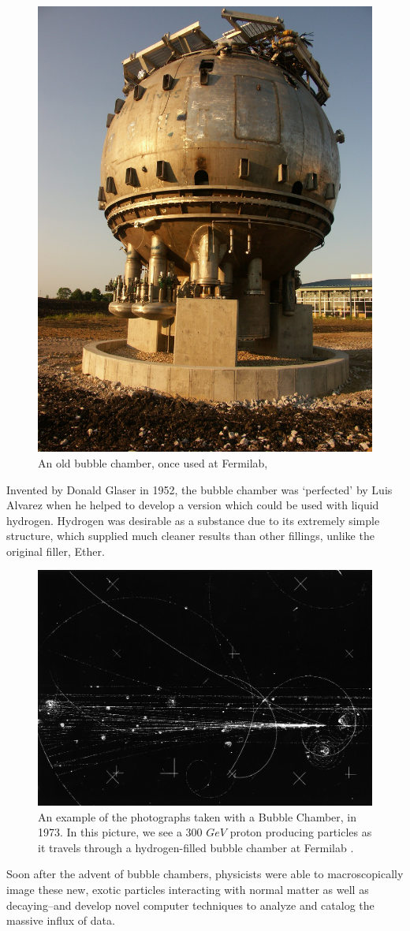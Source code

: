 \begin{figure}[ht]
	\centering
	\includegraphics[width=0.5\linewidth]{./figures/bubblechamberfnal.jpg}
	\caption{An old bubble chamber, once used at Fermilab,
	 \cite{FNALBubbleChamber2005}}
	\label{fig:bubble_chamber}
\end{figure}

Invented by Donald Glaser in 1952, the bubble chamber was `perfected' by Luis
Alvarez when he helped to develop a version which could be used with liquid
hydrogen. Hydrogen was desirable as a substance due to its extremely simple
structure, which supplied much cleaner results than other fillings, unlike the
original filler, Ether.

\begin{figure}[ht]
	\centering
	\includegraphics[width=0.5\linewidth]{./figures/bubble_chamber_tracks.jpg}
	\caption{
		An example of the photographs taken with a Bubble Chamber, in 1973.
		In this picture, we see a 300 $GeV$ proton producing particles as it travels
		through a hydrogen-filled bubble chamber at Fermilab  \cite{HD6B235}.
	}
	\label{fig:bubble_tracks}
\end{figure}

Soon after the advent of bubble chambers, physicists were able to
macroscopically image these new, exotic particles interacting with normal matter
as well as decaying--and develop novel computer techniques to analyze and
catalog the massive influx of data.

